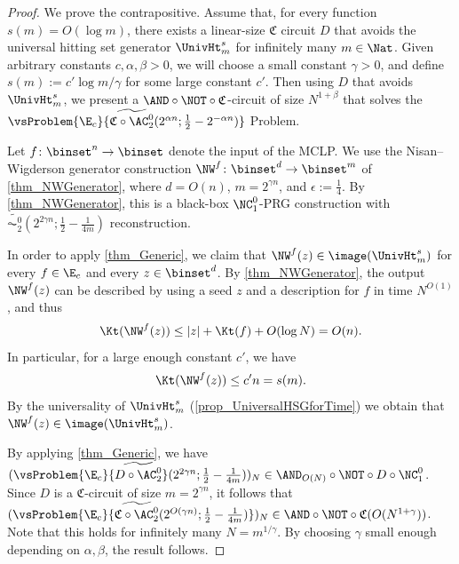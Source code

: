 \documentclass{toc}
\begin{document}
\begin{proof}
  We prove the contrapositive.
  Assume that,
  for every function $s(m) = O(\log m)$,
  there exists a linear-size $\mathfrak{C}$ circuit $D$ that avoids the universal hitting set generator $\UnivHt_m^s$
  for infinitely many $m \in \Nat$.
  Given arbitrary constants $c, \alpha, \beta > 0$,
  we will choose a small constant $\gamma > 0$,
  and define $s(m) := c' \log m / \gamma$ for some large constant $c'$.
  Then using $D$ that avoids $\UnivHt_m^s$,
  we present a $\AND \circ \NOT \circ \mathfrak{C}$-circuit of size $N^{1 + \beta}$ that solves the
  $\vsProblem{\E_c}{\widetilde{\mathfrak{C} \circ \AC^0_2} (2^{\alpha n} ; \frac{1}{2} - 2^{- \alpha n})}$ Problem.

  Let $f \colon \binset^n \to \binset$ denote the input of the MCLP.
  We use the Nisan--Wigderson generator construction $\NW^{f} \colon \binset^{d} \to \binset^{m}$ of \cref{thm_NWGenerator},
  where $d = O(n)$, $m = 2^{\gamma n}$, and $\epsilon := \frac{1}{4}$.
  By \cref{thm_NWGenerator}, this is a black-box $\NC^0_1$-PRG construction with $\widetilde{\AC^0_2}(2^{2 \gamma n}; \frac{1}{2} - \frac{1}{4 m})$ reconstruction.

  In order to apply \cref{thm_Generic},
  we claim that $\NW^f(z) \in \image(\UnivHt_m^s)$
  for every $f \in \E_c$ and every $z \in \binset^d$.
  By \cref{thm_NWGenerator},
  the output $\NW^f(z)$ can be described by
  using a seed $z$ and a description for $f$ in time $N^{O(1)}$,
  and thus
  \begin{align*}
    \Kt(\NW^{f}(z)) \le |z| + \Kt(f) + O(\log N) = O(n).
  \end{align*}
  In particular, for a large enough constant $c'$, we have
  \begin{align*}
    \Kt(\NW^{f}(z)) \le c' n = s(m).
  \end{align*}
  By the universality of $\UnivHt_m^s$ (\cref{prop_UniversalHSGforTime})
  we obtain that $\NW^f(z) \in \image(\UnivHt_m^s)$.

  By applying \cref{thm_Generic},
  we have $(\vsProblem{\E_c}{\widetilde{D \circ \AC^0_2}}(2^{2 \gamma n}; \frac{1}{2} - \frac{1}{4 m}))_N \in \AND_{O(N)} \circ \NOT \circ D \circ \NC^0_1$.
  Since $D$ is a $\mathfrak{C}$-circuit of size $m = 2^{\gamma n}$,
  it follows that
  $(\vsProblem{\E_c}{\widetilde{\mathfrak{C} \circ \AC^0_2}(2^{O(\gamma n)}; \frac{1}{2} - \frac{1}{4 m})})_N \in \AND \circ \NOT \circ \mathfrak{C} (O(N^{1 + \gamma}))$.
  Note that this holds for infinitely many $N = m^{1 / \gamma}$.
  By choosing $\gamma$ small enough depending on $\alpha, \beta$, the result follows.
\end{proof}
\end{document}
